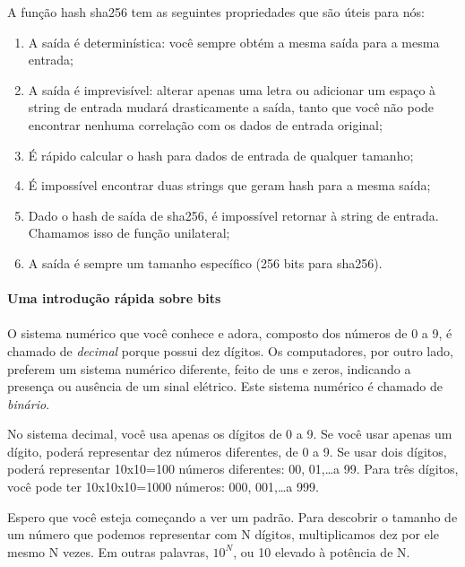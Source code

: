 A função hash sha256 tem as seguintes propriedades que são úteis para nós:

\begin{enumerate}
\item A saída é determinística: você sempre obtém a mesma saída para a mesma entrada;
\item A saída é imprevisível: alterar apenas uma letra ou adicionar um espaço à string de entrada mudará drasticamente a saída, tanto que você não pode encontrar nenhuma correlação com os dados de entrada original;
\item É rápido calcular o hash para dados de entrada de qualquer tamanho;
\item É impossível encontrar duas strings que geram hash para a mesma saída;
\item Dado o hash de saída de sha256, é impossível retornar à string de entrada. Chamamos isso de função unilateral;
\item A saída é sempre um tamanho específico (256 bits para sha256).
\end{enumerate}

\newpage

\paragraph{Uma introdução rápida sobre bits}
\paragraph{}

O sistema numérico que você conhece e adora, composto dos números de 0 a 9, é chamado de \textit{decimal} porque possui dez dígitos. Os computadores, por outro lado, preferem um sistema numérico diferente, feito de uns e zeros, indicando a presença ou ausência de um sinal elétrico. Este sistema numérico é chamado de \textit{binário}.

No sistema decimal, você usa apenas os dígitos de 0 a 9. Se você usar apenas um dígito, poderá representar dez números diferentes, de 0 a 9. Se usar dois dígitos, poderá representar 10x10=100 números diferentes: 00, 01,\ldots a 99. Para três dígitos, você pode ter 10x10x10=1000 números: 000, 001,\ldots a 999.

Espero que você esteja começando a ver um padrão. Para descobrir o tamanho de um número que podemos representar com N dígitos, multiplicamos dez por ele mesmo N vezes. Em outras palavras, \(10^N\), ou 10 elevado à potência de N.


